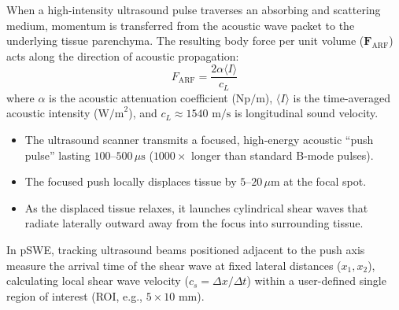 \documentclass[11pt,a4paper]{article}
\begin{document}
\begin{physicsbox}
When a high-intensity ultrasound pulse traverses an absorbing and scattering medium, momentum is transferred from the acoustic wave packet to the underlying tissue parenchyma. The resulting body force per unit volume ($\mathbf{F}_{\text{ARF}}$) acts along the direction of acoustic propagation:
\begin{equation}
    F_{\text{ARF}} = \frac{2 \alpha \langle I \rangle}{c_L}
\end{equation}
where $\alpha$ is the acoustic attenuation coefficient ($\text{Np/m}$), $\langle I \rangle$ is the time-averaged acoustic intensity ($\text{W/m}^2$), and $c_L \approx 1540\text{ m/s}$ is longitudinal sound velocity.
\begin{itemize}
    \item The ultrasound scanner transmits a focused, high-energy acoustic ``push pulse'' lasting $100\text{--}500\,\mu\text{s}$ ($1000\times$ longer than standard B-mode pulses).
    \item The focused push locally displaces tissue by $5\text{--}20\,\mu\text{m}$ at the focal spot.
    \item As the displaced tissue relaxes, it launches cylindrical shear waves that radiate laterally outward away from the focus into surrounding tissue.
\end{itemize}
\end{physicsbox}

In pSWE, tracking ultrasound beams positioned adjacent to the push axis measure the arrival time of the shear wave at fixed lateral distances ($x_1, x_2$), calculating local shear wave velocity ($c_s = \Delta x / \Delta t$) within a user-defined single region of interest (ROI, e.g., $5 \times 10\text{ mm}$).
\end{document}
